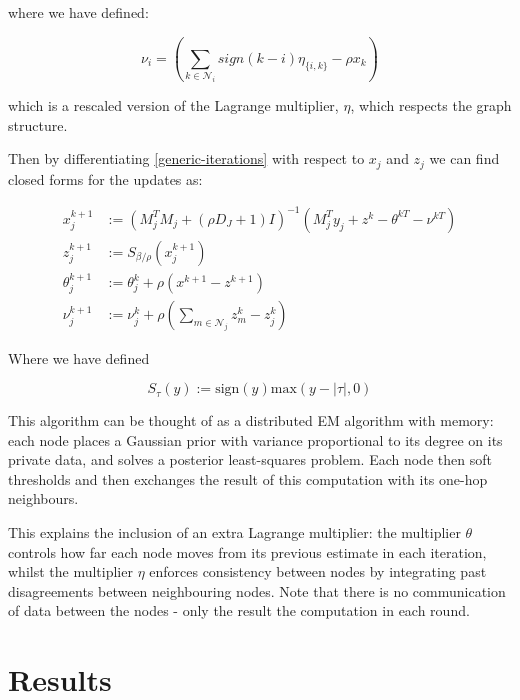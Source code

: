 where we have defined:

\begin{equation}
\nu_i = \left(\sum_{k \in \mathcal{N}_i} sign\left(k-i\right)\eta_{\{i,k\}} - \rho x_k \right)
\end{equation}

which is a rescaled version of the Lagrange multiplier, \(\eta\), which respects the graph structure. 

Then by differentiating \eqref{generic-iterations} with respect to \(x_j\) and \(z_j\) we  can find closed forms for the updates as:

\begin{align}
x_j^{k+1} &:= \left(M_j^TM_j + (\rho D_J + 1) I\right)^{-1}\left(M_j^Ty_j +  z^k -\theta^{kT} - \nu^{kT}\right)\\
z_j^{k+1} &:= S_{\beta/\rho}\left(x_j^{k+1} \right)
 \\
\theta_j^{k+1} &:= \theta_j^{k} + \rho \left(x^{k+1}-z^{k+1}\right) \\
\nu_j^{k+1} &:= \nu_j^k + \rho\left(\sum_{m \in \mathcal{N}_j} z_m^k - z_j^k\right)
\label{dadmm_algo_lasso}
\end{align}

Where we have defined

\begin{defn}
\begin{equation}
S_{\tau}\left( y \right) := \mathrm{sign}(y)\mathrm{max}(y-|\tau|, 0)
\end{equation}
\end{defn}

\begin{remark}
This algorithm can be thought of as a distributed EM algorithm with memory: each node places a Gaussian prior with variance proportional to its degree on its private data, and solves a posterior least-squares problem. Each node then soft thresholds and then exchanges the result of this computation with its one-hop neighbours.
 
This explains the inclusion of an extra Lagrange multiplier: the multiplier \(\theta\) controls how far each node moves from its previous estimate in each iteration, whilst the multiplier \(\eta\) enforces consistency between nodes by integrating past disagreements between neighbouring nodes. Note that there is no communication of data between the nodes - only the result the computation in each round.
\end{remark}

\section{Results} \label{sec:results}

